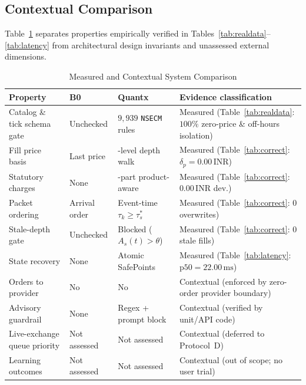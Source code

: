 \documentclass[12pt]{article}
\newcommand{\thinunit}[2]{#1\,\text{#2}}
\begin{document}
\subsection{Contextual Comparison}
Table~\ref{tab:context} separates properties empirically verified in Tables~\ref{tab:realdata}--\ref{tab:latency} from architectural design invariants and unassessed external dimensions.

\begin{table}[!htbp]\begin{singlespace}
\caption{Measured and Contextual System Comparison}
\label{tab:context}
\centering
\small
\renewcommand{\arraystretch}{1.12}
\begin{tabularx}{\textwidth}{@{}>{\raggedright\arraybackslash}p{1.25in}>{\raggedright\arraybackslash}p{1.05in}>{\raggedright\arraybackslash}p{1.15in}X@{}}
\toprule
Property & B0 & Quantx & Evidence classification \\
\midrule
Catalog \& tick schema gate & Unchecked & $9{,}939$ \texttt{NSECM} rules & Measured (Table~\ref{tab:realdata}: $100\%$ zero-price \& off-hours isolation) \\
Fill price basis & Last price & 5-level depth walk & Measured (Table~\ref{tab:correct}: $\delta_p=\thinunit{0.00}{INR}$) \\
Statutory charges & None & 6-part product-aware & Measured (Table~\ref{tab:correct}: $\thinunit{0.00}{INR}$ dev.) \\
Packet ordering & Arrival order & Event-time $\tau_k \ge \tau^*_s$ & Measured (Table~\ref{tab:correct}: 0 overwrites) \\
Stale-depth gate & Unchecked & Blocked ($A_s(t)>\theta$) & Measured (Table~\ref{tab:correct}: 0 stale fills) \\
State recovery & None & Atomic SafePoints & Measured (Table~\ref{tab:latency}: $\text{p50}=\thinunit{22.00}{ms}$) \\
Orders to provider & No & No & Contextual (enforced by zero-order provider boundary) \\
Advisory guardrail & None & Regex + prompt block & Contextual (verified by unit/API code) \\
Live-exchange queue priority & Not assessed & Not assessed & Contextual (deferred to Protocol~D) \\
Learning outcomes & Not assessed & Not assessed & Contextual (out of scope; no user trial) \\
\bottomrule
\end{tabularx}
\end{singlespace}\end{table}
\end{document}

